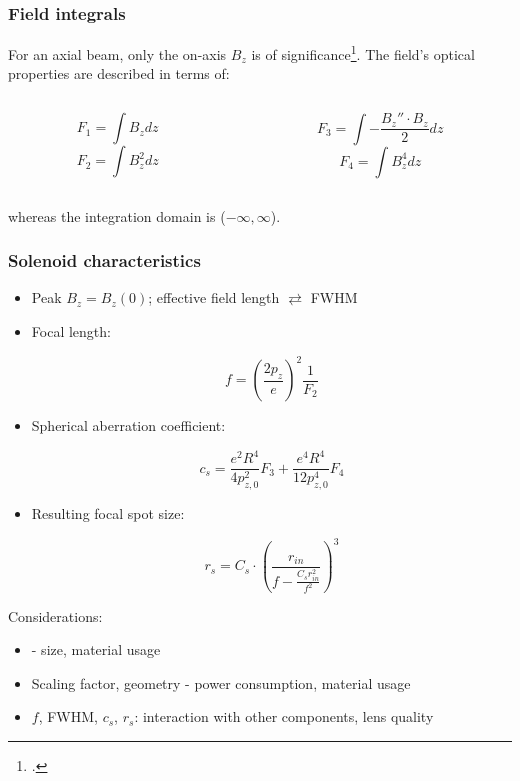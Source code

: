 \begin{frame}
  \rfn
  \frametitle{Field integrals}
  For an axial beam, only the on-axis $B_z$ is of significance\footcite{Disser}. The field's optical properties are described in terms of:
  \begin{columns}
    \begin{column}{0.5\textwidth}
      \begin{center}
      \begin{small}
        \[F_1 = \int B_z dz\]
        \[F_2 = \int B_z^2 dz\]
      \end{small}
      \end{center}
    \end{column}
    \begin{column}{0.5\textwidth}
      \begin{center}
      \begin{small}
      \[F_3 = \int - \frac{B_z''\cdot B_z}{2} dz \]
      \[F_4 = \int B_z^4 dz\]
      \end{small}
      \end{center}
    \end{column}
  \end{columns}
  \vspace{1cm}
  whereas the integration domain is ($-\infty,\infty$).
\end{frame}

\begin{frame}
  \rfn
  \frametitle{Solenoid characteristics}
    \begin{itemize}
      \item Peak $B_z = B_z(0)$; effective field length $\rightleftarrows$ FWHM
      \item Focal length:
        \begin{small}
          \[
          f = \left(\frac{2p_z}{e}\right)^2\frac{1}{F_2}
          \]
        \end{small}
      \item Spherical aberration coefficient:
        \begin{small}
          \[
          c_s = \frac{e^{2}R^{4}}{4p_{z,0}^{2}}F_{3}+\frac{e^{4}R^{4}}{12p_{z,0}^{4}}F_{4}
          \]
        \end{small}
      \item Resulting focal spot size:
        \begin{small}
        \[
        r_{s}=C_{s}\cdotp\left(\frac{r_{in}}{f-\frac{C_{s}r_{in}^{2}}{f^{2}}}\right)^{3}
        \]
        \end{small}
    \end{itemize}
    \vspace{0.5cm}
    Considerations:
    \begin{itemize}
      \item  - size, material usage
      \item Scaling factor, geometry - power consumption, material usage
      \item $f$, FWHM, $c_s$, $r_s$: interaction with other components, lens quality
    \end{itemize}
\end{frame}


